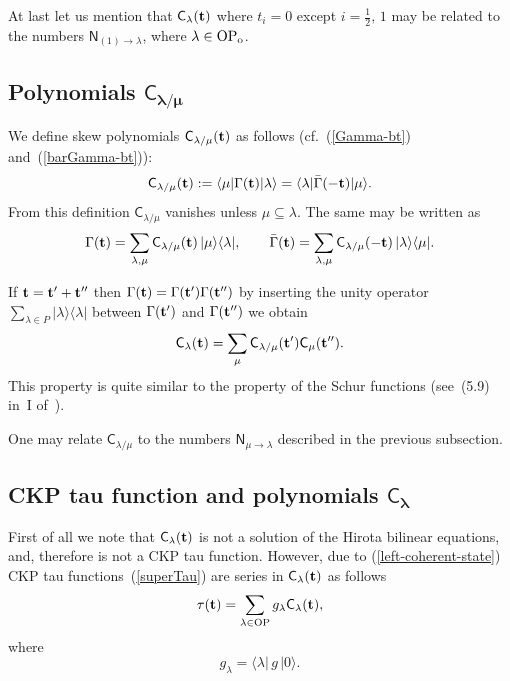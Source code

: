 \documentclass[pdftex]{sigma}
\numberwithin{equation}{section}
\newcommand{\C}{\textsf{C}_}
\newcommand{\G}{\Gamma}
\newcommand{\bt}{{\bf {t}}}
\renewcommand{\l}{\langle}
\renewcommand{\r}{\rangle}
\begin{document}
At last let us mention that $\C\lambda(\bt)$ where $t_i=0$ except
$i=\frac 12,\, 1$ may be related to the numbers $\textsf{N}_{(1)\to
\lambda}$, where $\lambda\in\rm OP_o$.

\subsection[Polynomials $\textsf{C}_{\lambda/\mu}$]{Polynomials $\boldsymbol{\textsf{C}_{\lambda/\mu}}$}

We def\/ine skew polynomials $\textsf{C}_{\lambda/\mu}(\bt)$ as
follows (cf.~(\ref{Gamma-bt}) and~(\ref{barGamma-bt})):
\[
\textsf{C}_{\lambda/\mu}(\bt) := \l \mu|\G(\bt)|\lambda \r = \l
\lambda|{\bar\G}(-\bt)|\mu \r.
\]
 From this def\/inition $\textsf{C}_{\lambda/\mu}$ vanishes
unless $\mu \subseteq \lambda$. The same may be written as
 \begin{gather*}
\G(\bt) = \sum_{\lambda,\mu} \C{\lambda/\mu}(\bt)\,|\mu \r \l
\lambda|, \qquad
{\bar\G}(\bt) = \sum_{\lambda,\mu} \C{\lambda/\mu}(-\bt)\,|\lambda
\r \l \mu|.
\end{gather*}


 If $\bt=\bt'+\bt''$ then $\G(\bt)=\G(\bt')\G(\bt'')$ by inserting the unity
 operator $\sum\limits_{\lambda\in P}|\lambda\r \l \lambda|$ between $\G(\bt')$ and $\G(\bt'')$
 we obtain
\[
\textsf{C}_{\lambda}(\bt) = \sum_{\mu}
 \textsf{C}_{\lambda/\mu}(\bt')\textsf{C}_{\mu}(\bt'').
\]
  This property is quite similar to the property of the Schur
  functions (see~(5.9) in~I of~\cite{Mac}).

  One may relate $\C{\lambda/\mu}$ to the numbers $
  \textsf{N}_{\mu\to\lambda}$ described in the previous
  subsection.


\subsection[CKP tau function and polynomials $\textsf{C}_\lambda$]{CKP tau function and polynomials $\boldsymbol{\textsf{C}_\lambda}$}\label{CKPpolynomials}

First of all we note that $\textsf{C}_\lambda(\bt)$ is not a solution of the Hirota bilinear equations, and, therefore
is not a CKP tau function.
However, due to (\ref{left-coherent-state}) CKP tau functions~(\ref{superTau}) are series in $\textsf{C}_\lambda(\bt)$ as
follows
\[
\tau(\bt)=\sum_{\lambda\in\rm OP} g_\lambda \textsf{C}_\lambda(\bt),
\]
 where
 \[
g_\lambda = \l \lambda |\,g\,|0\r.
 \]
\end{document}
